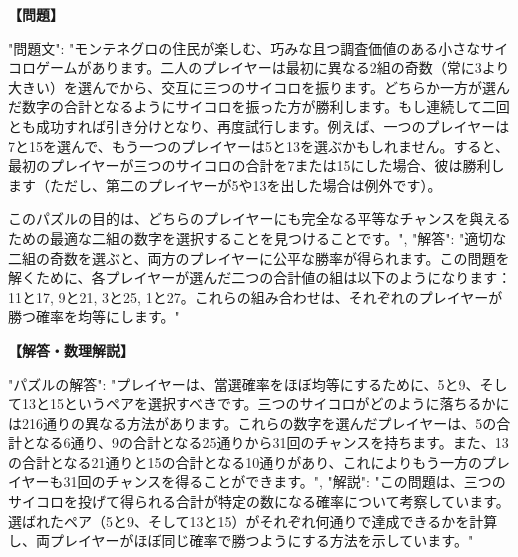 \documentclass[10pt,a4paper,oneside,openany]{ltjsbook}
\begin{document}
\begin{tcolorbox}[colback=softblue,colframe=primaryblue,title=\textbf{第 397 問：THE MONTENEGRIN DICE GAME.},arc=2mm,boxrule=1pt,breakable]
\textbf{【問題】}\par\vspace{0.3em}
{
"問題文": "モンテネグロの住民が楽しむ、巧みな且つ調査価値のある小さなサイコロゲームがあります。二人のプレイヤーは最初に異なる2組の奇数（常に3より大きい）を選んでから、交互に三つのサイコロを振ります。どちらか一方が選んだ数字の合計となるようにサイコロを振った方が勝利します。もし連続して二回とも成功すれば引き分けとなり、再度試行します。例えば、一つのプレイヤーは7と15を選んで、もう一つのプレイヤーは5と13を選ぶかもしれません。すると、最初のプレイヤーが三つのサイコロの合計を7または15にした場合、彼は勝利します（ただし、第二のプレイヤーが5や13を出した場合は例外です）。

このパズルの目的は、どちらのプレイヤーにも完全なる平等なチャンスを與えるための最適な二組の数字を選択することを見つけることです。",
"解答": "適切な二組の奇数を選ぶと、両方のプレイヤーに公平な勝率が得られます。この問題を解くために、各プレイヤーが選んだ二つの合計値の組は以下のようになります：11と17, 9と21, 3と25, 1と27。これらの組み合わせは、それぞれのプレイヤーが勝つ確率を均等にします。"
}
\tcblower
\textbf{【解答・数理解説】}\par\vspace{0.3em}
{
"パズルの解答": "プレイヤーは、當選確率をほぼ均等にするために、5と9、そして13と15というペアを選択すべきです。三つのサイコロがどのように落ちるかには216通りの異なる方法があります。これらの数字を選んだプレイヤーは、5の合計となる6通り、9の合計となる25通りから31回のチャンスを持ちます。また、13の合計となる21通りと15の合計となる10通りがあり、これによりもう一方のプレイヤーも31回のチャンスを得ることができます。",
"解説": "この問題は、三つのサイコロを投げて得られる合計が特定の数になる確率について考察しています。選ばれたペア（5と9、そして13と15）がそれぞれ何通りで達成できるかを計算し、両プレイヤーがほぼ同じ確率で勝つようにする方法を示しています。"
}
\end{tcolorbox}
\end{document}
